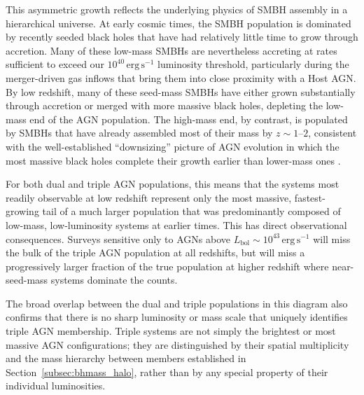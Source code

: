 \documentclass[twocolumn, 10pt]{article}
\begin{document}
This asymmetric growth reflects the underlying physics of SMBH assembly in a hierarchical universe. At early cosmic times, the SMBH population is dominated by recently seeded black holes that have had relatively little time to grow through accretion. Many of these low-mass SMBHs are nevertheless accreting at rates sufficient to exceed our $10^{40}\,\mathrm{erg\,s^{-1}}$ luminosity threshold, particularly during the merger-driven gas inflows that bring them into close proximity with a Host AGN. By low redshift, many of these seed-mass SMBHs have either grown substantially through accretion or merged with more massive black holes, depleting the low-mass end of the AGN population. The high-mass end, by contrast, is populated by SMBHs that have already assembled most of their mass by $z \sim 1$--$2$, consistent with the well-established ``downsizing'' picture of AGN evolution in which the most massive black holes complete their growth earlier than lower-mass ones \citep[e.g.][]{Marconi2004}.
 
For both dual and triple AGN populations, this means that the systems most readily observable at low redshift represent only the most massive, fastest-growing tail of a much larger population that was predominantly composed of low-mass, low-luminosity systems at earlier times. This has direct observational consequences. Surveys sensitive only to AGNs above $L_\mathrm{bol} \sim 10^{43}\,\mathrm{erg\,s^{-1}}$ will miss the bulk of the triple AGN population at all redshifts, but will miss a progressively larger fraction of the true population at higher redshift where near-seed-mass systems dominate the counts.
 
The broad overlap between the dual and triple populations in this diagram also confirms that there is no sharp luminosity or mass scale that uniquely identifies triple AGN membership. Triple systems are not simply the brightest or most massive AGN configurations; they are distinguished by their spatial multiplicity and the mass hierarchy between members established in Section~\ref{subsec:bhmass_halo}, rather than by any special property of their individual luminosities.
 
\end{document}
